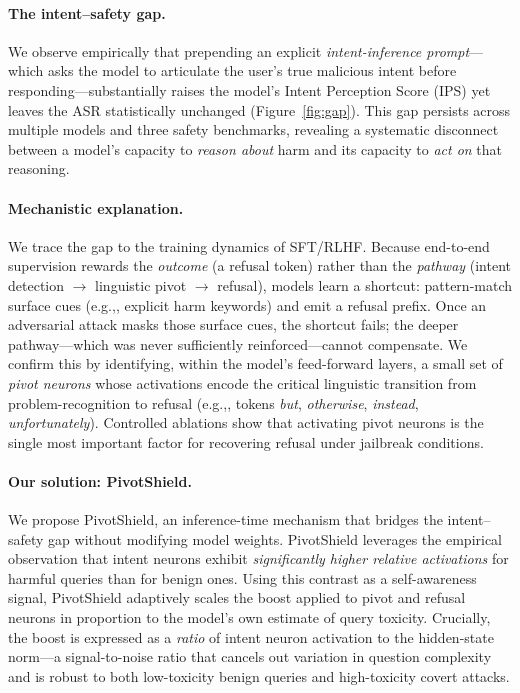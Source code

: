 \documentclass{article}
\newcommand{\method}{PivotShield\xspace}
\newcommand{\eg}{e.g.,\xspace}
\begin{document}
\paragraph{The intent--safety gap.}
We observe empirically that prepending an explicit
\emph{intent-inference prompt}---which asks the model to articulate
the user's true malicious intent before responding---substantially
raises the model's Intent Perception Score (IPS) yet leaves the
ASR statistically unchanged (Figure~\ref{fig:gap}).
This gap persists across multiple models and three safety benchmarks,
revealing a systematic disconnect between a model's capacity to
\emph{reason about} harm and its capacity to \emph{act on} that
reasoning.

\paragraph{Mechanistic explanation.}
We trace the gap to the training dynamics of SFT/RLHF.
Because end-to-end supervision rewards the \emph{outcome}
(a refusal token) rather than the \emph{pathway}
(intent detection $\to$ linguistic pivot $\to$ refusal), models
learn a shortcut: pattern-match surface cues (\eg, explicit harm
keywords) and emit a refusal prefix.
Once an adversarial attack masks those surface cues, the shortcut
fails; the deeper pathway---which was never sufficiently
reinforced---cannot compensate.
We confirm this by identifying, within the model's feed-forward
layers, a small set of \emph{pivot neurons} whose activations
encode the critical linguistic transition from problem-recognition
to refusal (\eg, tokens \emph{but}, \emph{otherwise},
\emph{instead}, \emph{unfortunately}).
Controlled ablations show that activating pivot neurons is the
single most important factor for recovering refusal under
jailbreak conditions.

\paragraph{Our solution: \method.}
We propose \method, an inference-time mechanism that bridges the
intent--safety gap without modifying model weights.
\method leverages the empirical observation that intent neurons
exhibit \emph{significantly higher relative activations} for
harmful queries than for benign ones.
Using this contrast as a self-awareness signal, \method
adaptively scales the boost applied to pivot and refusal neurons
in proportion to the model's own estimate of query toxicity.
Crucially, the boost is expressed as a \emph{ratio} of intent
neuron activation to the hidden-state norm---a signal-to-noise
ratio that cancels out variation in question complexity and is
robust to both low-toxicity benign queries and high-toxicity
covert attacks.
\end{document}
